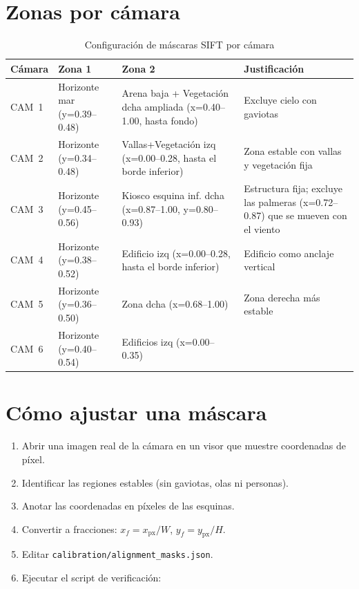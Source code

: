 \section{Zonas por cámara}

\begin{table}[H]
\centering
\caption{Configuración de máscaras SIFT por cámara}
\label{tab:masks}
\begin{tabular}{C{1.5cm} L{3.5cm} C{3.5cm} L{4.5cm}}
\toprule
\textbf{Cámara} & \textbf{Zona 1} & \textbf{Zona 2} & \textbf{Justificación} \\
\midrule
CAM~1 & Horizonte mar (y=0.39--0.48) & Arena baja + Vegetación dcha ampliada (x=0.40--1.00, hasta fondo) & Excluye cielo con gaviotas \\
CAM~2 & Horizonte (y=0.34--0.48)    & Vallas+Vegetación izq (x=0.00--0.28, hasta el borde inferior) & Zona estable con vallas y vegetación fija \\
CAM~3 & Horizonte (y=0.45--0.56)    & Kiosco esquina inf. dcha (x=0.87--1.00, y=0.80--0.93) & Estructura fija; excluye las palmeras (x=0.72--0.87) que se mueven con el viento \\
CAM~4 & Horizonte (y=0.38--0.52)    & Edificio izq (x=0.00--0.28, hasta el borde inferior) & Edificio como anclaje vertical \\
CAM~5 & Horizonte (y=0.36--0.50)    & Zona dcha (x=0.68--1.00)                   & Zona derecha más estable \\
CAM~6 & Horizonte (y=0.40--0.54)    & Edificios izq (x=0.00--0.35)               & \\
\bottomrule
\end{tabular}
\end{table}

\section{Cómo ajustar una máscara}

\begin{enumerate}[leftmargin=1.5em]
  \item Abrir una imagen real de la cámara en un visor que muestre coordenadas de píxel.
  \item Identificar las regiones estables (sin gaviotas, olas ni personas).
  \item Anotar las coordenadas en píxeles de las esquinas.
  \item Convertir a fracciones: $x_f = x_\text{px}/W$, $y_f = y_\text{px}/H$.
  \item Editar \texttt{calibration/alignment\_masks.json}.
  \item Ejecutar el script de verificación:
\end{enumerate}

